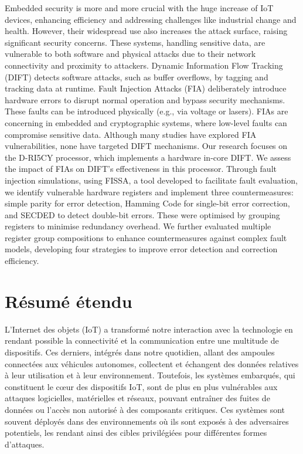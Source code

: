 Embedded security is more and more crucial with the huge increase of IoT devices, enhancing efficiency and addressing challenges like industrial change and health. However, their widespread use also increases the attack surface, raising significant security concerns. These systems, handling sensitive data, are vulnerable to both software and physical attacks due to their network connectivity and proximity to attackers.
Dynamic Information Flow Tracking (DIFT) detects software attacks, such as buffer overflows, by tagging and tracking data at runtime. Fault Injection Attacks (FIA) deliberately introduce hardware errors to disrupt normal operation and bypass security mechanisms. These faults can be introduced physically (e.g., via voltage or lasers). FIAs are concerning in embedded and cryptographic systems, where low-level faults can compromise sensitive data. Although many studies have explored FIA vulnerabilities, none have targeted DIFT mechanisms.
Our research focuses on the D-RI5CY processor, which implements a hardware in-core DIFT. We assess the impact of FIAs on DIFT's effectiveness in this processor. Through fault injection simulations, using FISSA, a tool developed to facilitate fault evaluation, we identify vulnerable hardware registers and implement three countermeasures: simple parity for error detection, Hamming Code for single-bit error correction, and SECDED to detect double-bit errors. These were optimised by grouping registers to minimise redundancy overhead. We further evaluated multiple register group compositions to enhance countermeasures against complex fault models, developing four strategies to improve error detection and correction efficiency.


\chapter*{Résumé étendu}
\label{chapter:extended_resume}

L'Internet des objets (IoT) a transformé notre interaction avec la technologie en rendant possible la connectivité et la communication entre une multitude de dispositifs. Ces derniers, intégrés dans notre quotidien, allant des ampoules connectées aux véhicules autonomes, collectent et échangent des données relatives à leur utilisation et à leur environnement. Toutefois, les systèmes embarqués, qui constituent le cœur des dispositifs IoT, sont de plus en plus vulnérables aux attaques logicielles, matérielles et réseaux, pouvant entraîner des fuites de données ou l’accès non autorisé à des composants critiques. Ces systèmes sont souvent déployés dans des environnements où ils sont exposés à des adversaires potentiels, les rendant ainsi des cibles privilégiées pour différentes formes d'attaques.

